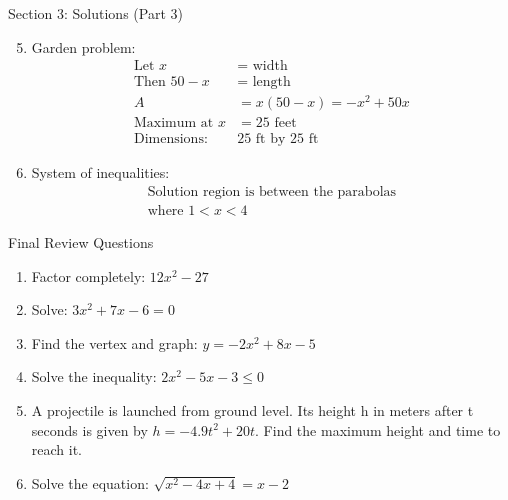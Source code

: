 \documentclass[aspectratio=169]{beamer}
\begin{document}
\begin{frame}{Section 3: Solutions (Part 3)}
    \begin{tcolorbox}[colback=lightgray,colframe=accent,title=Detailed Solutions (Continued)]
        \footnotesize
        \begin{enumerate}
            \setcounter{enumi}{4}
            \item Garden problem:
            \begin{align*}
                \text{Let } x &= \text{ width} \\
                \text{Then } 50-x &= \text{ length} \\
                A &= x(50-x) = -x^2 + 50x \\
                \text{Maximum at } x &= 25 \text{ feet} \\
                \text{Dimensions: } &25 \text{ ft by } 25 \text{ ft}
            \end{align*}
            
            \item System of inequalities:
            \begin{align*}
                \text{Solution region is between the parabolas} \\
                \text{where } 1 < x < 4
            \end{align*}
        \end{enumerate}
    \end{tcolorbox}
\end{frame}

\begin{frame}{Final Review Questions}
    \begin{tcolorbox}[colback=lightgray,colframe=primary,title=Comprehensive Review]
        \footnotesize
        \begin{enumerate}
            \setlength{\itemsep}{0.5em}
            \item Factor completely: $12x^2 - 27$
            \item Solve: $3x^2 + 7x - 6 = 0$
            \item Find the vertex and graph: $y = -2x^2 + 8x - 5$
            \item Solve the inequality: $2x^2 - 5x - 3 \leq 0$
            \item A projectile is launched from ground level. Its height h in meters after t seconds is given by $h = -4.9t^2 + 20t$. Find the maximum height and time to reach it.
            \item Solve the equation: $\sqrt{x^2 - 4x + 4} = x - 2$
        \end{enumerate}
    \end{tcolorbox}
\end{frame}
\end{document}

